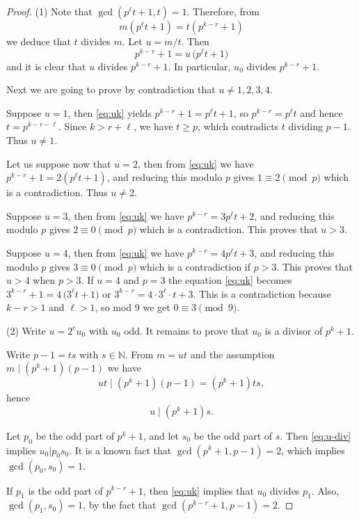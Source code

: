\documentclass[oneside,a4paper,12pt]{article}
\theoremstyle{plain} %
\theoremstyle{definition} %
\begin{document}
\begin{proof}
(1) \quad Note that
$  \gcd(p^\ell t+1,t) = 1$.
Therefore, from
\[
  m(p^\ell t+1) = t(p^{k-r}+1)
\]
we deduce that $t$ divides $m$. Let $u=m/t$.
Then
\begin{equation}\label{eq:uk}
  p^{k-r}+1 = u\,\bigl(p^\ell t+1\bigr)
\end{equation}
and it is clear that $u$ divides $p^{k-r}+1$.
In particular, $u_0$ divides $p^{k-r}+1$.

Next we are going to prove by contradiction that $u\neq 1,2,3,4$.

Suppose $u=1$, then \eqref{eq:uk} yields
$  p^{k-r}+1 = p^\ell t+1$,
so $p^{k-r} = p^\ell t$ and hence $t = p^{k-r-\ell}$. Since $k>r+\ell$,
we have $t\ge p$, which contradicts $t$ dividing $p-1$.
Thus $u\neq1$.

Let us suppose now that $u=2$, then from \eqref{eq:uk} we have
$p^{k-r}+1 = 2(p^\ell t+1)$,
and reducing this modulo $p$ gives $1\equiv 2 \pmod{p}$ which is a contradiction.
 Thus $u\neq2$. 

Suppose $u=3$, then from \eqref{eq:uk} we have
$ p^{k-r} = 3p^\ell t+2$,
and reducing this modulo $p$ gives $2\equiv 0 \pmod{p}$ which is a contradiction.
This proves that $u>3$.


Suppose $u=4$, then from \eqref{eq:uk} we have
$ p^{k-r} = 4p^\ell t+3$,
and reducing this modulo $p$ gives $3\equiv 0 \pmod{p}$ which is a contradiction if $p>3$.
This proves that $u>4$ when $p>3$.
If $u=4$ and $p=3$ the equation \eqref{eq:uk} becomes
$3^{k-r}+1 = 4\,\bigl(3^\ell t+1\bigr)$
or
$3^{k-r} = 4\cdot 3^\ell \cdot t+3$.
This is a contradiction because $k-r>1$ and $\ell >1$,
so mod 9 we get $0\equiv 3 \pmod{9}$.

(2) \quad  Write $u = 2^e u_0$ with $u_0$ odd.
It remains to prove that $u_0$ is a divisor of  $p^k+1$.

Write $p-1 = ts$ with $s\in\mathbb{N}$. From $m=ut$ and the
assumption $m\mid (p^k+1)(p-1)$ we have
\[
  ut  \mid (p^k+1)(p-1) = (p^k+1)ts,
\]
hence
\begin{equation}\label{eq:u-div}
  u \mid (p^k+1)s.
\end{equation}

Let $p_0$ be the odd part of $p^k+1$, and let $s_0$ be the odd part of $s$.
Then \eqref{eq:u-div} implies $u_0 | p_0 s_0$.
It is a known fact that $\gcd(p^k+1,p-1)=2$, which implies $\gcd(p_0,s_0)=1$.


If $p_1$ is the odd part of $p^{k-r}+1$, then 
\eqref{eq:uk} implies that $u_0$ divides $p_1$.
Also, $\gcd(p_1,s_0)=1$, by the fact that $\gcd(p^{k-r}+1,p-1)=2$.


\end{proof}
\end{document}
